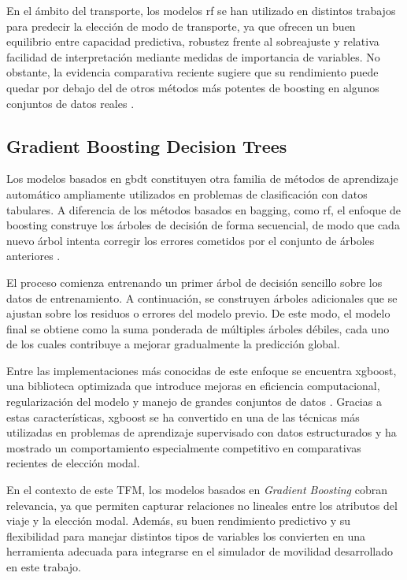 En el ámbito del transporte, los modelos \acrlong{rf} se han utilizado en distintos trabajos para predecir la elección de modo de transporte, ya que ofrecen un buen equilibrio entre capacidad predictiva, robustez frente al sobreajuste y relativa facilidad de interpretación mediante medidas de importancia de variables. No obstante, la evidencia comparativa reciente sugiere que su rendimiento puede quedar por debajo del de otros métodos más potentes de boosting en algunos conjuntos de datos reales \cite{MartinBaos2023TRC}.

\subsection{Gradient Boosting Decision Trees}

Los modelos basados en \gls{gbdt} constituyen otra familia de métodos de aprendizaje automático ampliamente utilizados en problemas de clasificación con datos tabulares. A diferencia de los métodos basados en bagging, como \acrlong{rf}, el enfoque de boosting construye los árboles de decisión de forma secuencial, de modo que cada nuevo árbol intenta corregir los errores cometidos por el conjunto de árboles anteriores \cite{Friedman2001}.\newline

El proceso comienza entrenando un primer árbol de decisión sencillo sobre los datos de entrenamiento. A continuación, se construyen árboles adicionales que se ajustan sobre los residuos o errores del modelo previo. De este modo, el modelo final se obtiene como la suma ponderada de múltiples árboles débiles, cada uno de los cuales contribuye a mejorar gradualmente la predicción global.
\newpage

Entre las implementaciones más conocidas de este enfoque se encuentra \gls{xgboost}, una biblioteca optimizada que introduce mejoras en eficiencia computacional, regularización del modelo y manejo de grandes conjuntos de datos \cite{Chen2016XGBoost}. Gracias a estas características, \gls{xgboost} se ha convertido en una de las técnicas más utilizadas en problemas de aprendizaje supervisado con datos estructurados y ha mostrado un comportamiento especialmente competitivo en comparativas recientes de elección modal.\newline

En el contexto de este TFM, los modelos basados en \textit{Gradient Boosting} cobran relevancia, ya que permiten capturar relaciones no lineales entre los atributos del viaje y la elección modal. Además, su buen rendimiento predictivo y su flexibilidad para manejar distintos tipos de variables los convierten en una herramienta adecuada para integrarse en el simulador de movilidad desarrollado en este trabajo.

